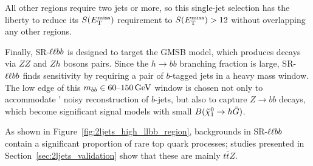 All other regions require two jets or more, so this single-jet selection has
the liberty to reduce its $\metsig$ requirement to $\metsig > 12$
without overlapping any other regions.

Finally, SR-$\llbb$ is designed to target the GMSB model, which produces decays
via $ZZ$ and $Zh$ bosons pairs.
Since the $h\rightarrow bb$ branching fraction is large, SR-$\llbb$ finds
sensitivity by requiring a pair of $b$-tagged jets in a heavy mass window.
The low edge of this $\mbb \in 60\textrm{--}150\,\eV[G]$ window is chosen not
only to accommodate \atlas' noisy reconstruction of $b$-jets, but also to
capture $Z\rightarrow bb$ decays, which become significant signal models with
small $B(\neutralino_1 \rightarrow h \gravitino)$.

As shown in Figure~\ref{fig:2ljets_high_llbb_region}, backgrounds in SR-$\llbb$
contain a significant proportion of rare top quark processes;
studies presented in Section~\ref{sec:2ljets_validation} show that these are
mainly $t\bar t Z$.

